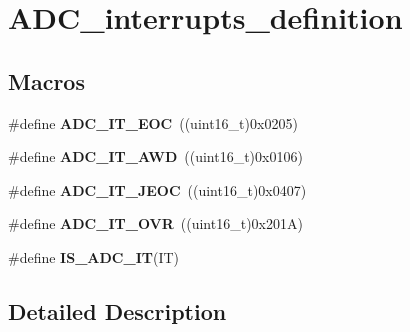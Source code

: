 \hypertarget{group___a_d_c__interrupts__definition}{\section{A\-D\-C\-\_\-interrupts\-\_\-definition}
\label{group___a_d_c__interrupts__definition}
}
\subsection*{Macros}
\begin{DoxyCompactItemize}
\item 
\hypertarget{group___a_d_c__interrupts__definition_ga0ad335d835f54415194d448019569e00}{\#define {\bfseries A\-D\-C\-\_\-\-I\-T\-\_\-\-E\-O\-C}~((uint16\-\_\-t)0x0205)}\label{group___a_d_c__interrupts__definition_ga0ad335d835f54415194d448019569e00}

\item 
\hypertarget{group___a_d_c__interrupts__definition_ga2f5c7f9900c24250a0c6ccaa7cbca946}{\#define {\bfseries A\-D\-C\-\_\-\-I\-T\-\_\-\-A\-W\-D}~((uint16\-\_\-t)0x0106)}\label{group___a_d_c__interrupts__definition_ga2f5c7f9900c24250a0c6ccaa7cbca946}

\item 
\hypertarget{group___a_d_c__interrupts__definition_gad439fc0cd69706704d47aeabfeddb631}{\#define {\bfseries A\-D\-C\-\_\-\-I\-T\-\_\-\-J\-E\-O\-C}~((uint16\-\_\-t)0x0407)}\label{group___a_d_c__interrupts__definition_gad439fc0cd69706704d47aeabfeddb631}

\item 
\hypertarget{group___a_d_c__interrupts__definition_gac3852b7789860e0ea79b82115ab877a0}{\#define {\bfseries A\-D\-C\-\_\-\-I\-T\-\_\-\-O\-V\-R}~((uint16\-\_\-t)0x201\-A)}\label{group___a_d_c__interrupts__definition_gac3852b7789860e0ea79b82115ab877a0}

\item 
\#define {\bfseries I\-S\-\_\-\-A\-D\-C\-\_\-\-I\-T}(I\-T)
\end{DoxyCompactItemize}


\subsection{Detailed Description}


